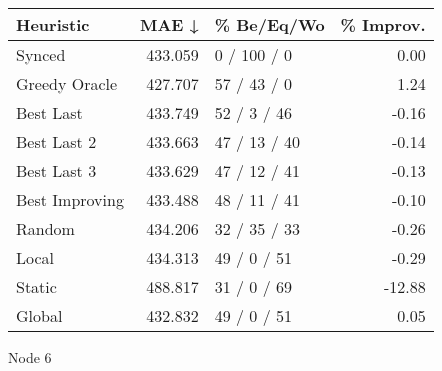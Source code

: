 \begin{tabular}{lrlr}
\toprule
\textbf{Heuristic} & \textbf{MAE ↓} & \textbf{\% Be/Eq/Wo} & \textbf{\% Improv.} \\
\midrule
            Synced &        433.059 &          0 / 100 / 0 &                0.00 \\
     Greedy Oracle &        427.707 &          57 / 43 / 0 &                1.24 \\
         Best Last &        433.749 &          52 / 3 / 46 &               -0.16 \\
       Best Last 2 &        433.663 &         47 / 13 / 40 &               -0.14 \\
       Best Last 3 &        433.629 &         47 / 12 / 41 &               -0.13 \\
    Best Improving &        433.488 &         48 / 11 / 41 &               -0.10 \\
            Random &        434.206 &         32 / 35 / 33 &               -0.26 \\
             Local &        434.313 &          49 / 0 / 51 &               -0.29 \\
            Static &        488.817 &          31 / 0 / 69 &              -12.88 \\
            Global &        432.832 &          49 / 0 / 51 &                0.05 \\
\bottomrule
\end{tabular}
\caption{Node 6}
\label{tab:non_lr05_le1_bs2_6}
